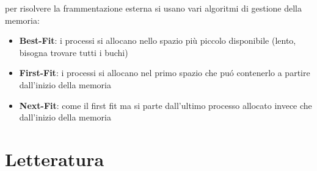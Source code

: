 \documentclass{article}
\begin{document}
{  per risolvere la frammentazione esterna si usano vari algoritmi di gestione della memoria:
  \begin{itemize}
    \item \textbf{Best-Fit}: i processi si allocano nello spazio più piccolo disponibile (lento, bisogna trovare tutti i buchi)
    \item \textbf{First-Fit}: i processi si allocano nel primo spazio che puó contenerlo a partire dall'inizio della memoria
    \item \textbf{Next-Fit}: come il first fit ma si parte dall'ultimo processo allocato invece che dall'inizio della memoria
  \end{itemize}
  }

  \pagebreak
  \section{Letteratura}
\end{document}
